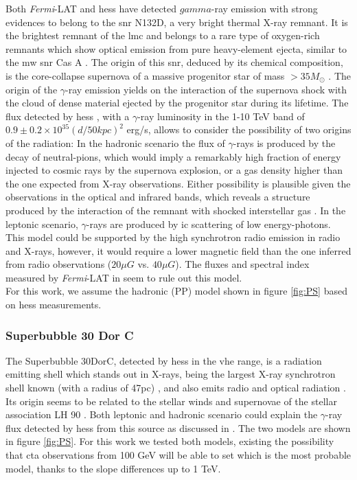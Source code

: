 \documentclass[main.tex]{subfiles}
\begin{document}
Both \textit{Fermi}-LAT and \gls{hess} have detected $gamma$-ray emission with strong evidences to belong to the \gls{snr} N132D, a very bright thermal X-ray remnant. It is the brightest remnant of the \gls{lmc} and belongs to a rare type of oxygen-rich remnants which show optical emission from pure heavy-element ejecta, similar to the \gls{mw} \gls{snr} Cas A \cite{2007N132D}. The origin of this \gls{snr}, deduced by its chemical composition, is the core-collapse supernova of a massive progenitor star of mass $> 35 M_{\odot}$ \cite{2007N132D}. The origin of the $\gamma$-ray emission yields on the interaction of the supernova shock with the cloud of dense material ejected by the progenitor star during its lifetime. The flux detected by \gls{hess} \cite{2015HESSTeVLMC}, with a $\gamma$-ray luminosity in the 1-10 TeV band of $0.9 \pm 0.2 \times 10^{35}(d/50kpc)^2$ erg/s, allows to consider the possibility of two origins of the radiation: In the hadronic scenario the flux of $\gamma$-rays is produced by the decay of neutral-pions, which would imply a remarkably high fraction of energy injected to cosmic rays by the supernova explosion, or a gas density higher than the one expected from X-ray observations. Either possibility is plausible given the observations in the optical and infrared bands, which reveals a structure produced by the interaction of the remnant with shocked interstellar gas \cite{2006shockn132D}. In the leptonic scenario, $\gamma$-rays are produced by \gls{ic} scattering of low energy-photons. This model could be supported by the high synchrotron radio emission in radio and X-rays, however, it would require a lower magnetic field than the one inferred from radio observations ($20 \mu G$ vs. $40\mu G$). The fluxes and spectral index measured by \textit{Fermi}-LAT in \cite{2016LMCFermiLAT} seem to rule out this model.\\
For this work, we assume the hadronic (PP) model shown in figure \ref{fig:PS} based on \gls{hess} measurements.


\subsubsection{Superbubble 30 Dor C}

The Superbubble 30DorC, detected by \gls{hess} in the \gls{vhe} range, is a radiation emitting shell which stands out in X-rays, being the largest X-ray synchrotron shell known (with a radius of 47pc) \cite{200430dorcxrays}, and also emits radio and optical radiation \cite{1985SNRsintheLMC30dorc}. Its origin seems to be related to the stellar winds and supernovae of the stellar association LH 90 \cite{198430dorLH90}. Both leptonic and hadronic scenario could explain the $\gamma$-ray flux detected by \gls{hess} from this source as discussed in \cite{2015HESSTeVLMC}. The two models are shown in figure \ref{fig:PS}. For this work we tested both models, existing the possibility that \gls{cta} observations from 100 GeV will be able to set which is the most probable model, thanks to the slope differences up to 1 TeV.
\end{document}
